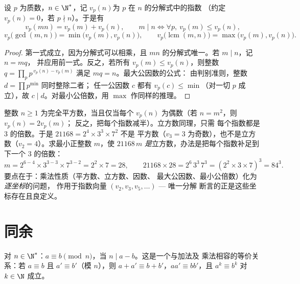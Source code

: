 \begin{proposition}[赋值]\label{prop:b1:arith:valuation}
设 $p$ 为质数，$n \in \N^*$，记 $v_p(n)$为 $p$ 在 $n$ 的分解式中的指数
（约定 $v_p(n) = 0$，若 $p \nmid n$）。于是有
\[
v_p(mn) = v_p(m) + v_p(n),
\qquad
m \mid n \iff \forall p,\ v_p(m) \leq v_p(n),
\]
\[
v_p\bigl(\gcd(m,n)\bigr) = \min\bigl(v_p(m), v_p(n)\bigr),
\qquad
v_p\bigl(\operatorname{lcm}(m,n)\bigr) = \max\bigl(v_p(m),
v_p(n)\bigr).
\]
\end{proposition}

\begin{proof}
第一式成立，因为分解式可以相乘，且
$mn$ 的分解式唯一。若 $m \mid n$，记 $n = mq$，
并应用前一式。反之，若所有 $v_p(m) \leq v_p(n)$，则整数 $q =
\prod_p p^{\,v_p(n) - v_p(m)}$ 满足 $mq = n$。最大公因数的公式：
由判别准则，整数 $d = \prod p^{\min}$ 同时整除二者；
任一公因数 $c$ 都有 $v_p(c) \leq \min$（对一切 $p$ 成立），故 $c
\mid d$。对最小公倍数，用 $\max$ 作同样的推理。
\end{proof}

\begin{example}[用赋值看平方数与立方数]\label{ex:b1:arith:squarecube}
整数 $n \geq 1$ 为完全平方数，当且仅当每个
$v_p(n)$ 为偶数（若 $n = m^2$，则 $v_p(n) = 2v_p(m)$；
反之，把每个指数减半）。立方数同理，只需
每个指数都是 $3$ 的倍数。于是 $21168 = 2^4 \times 3^3 \times 7^2$ 不是
平方数（$v_3 = 3$ 为奇数），也不是立方数（$v_2 = 4$）。求最小正整数 $m$，使
$21168\,m$ \emph{是}立方数，办法是把每个指数补足到
下一个
$3$ 的倍数：
\[
m = 2^{6-4} \times 3^{3-3} \times 7^{3-2} = 2^2 \times 7 = 28,
\qquad
21168 \times 28 = 2^6\,3^3\,7^3 = (2^2 \times 3 \times 7)^3
= 84^3 .
\]
要点在于：乘法性质（平方数、立方数、因数、
最大公因数、最小公倍数）化为\emph{逐坐标}的问题，
作用于指数向量 $(v_2, v_3, v_5, \dots)$ --- 唯一分解
断言的正是这些坐标存在且良定义。
\end{example}

\section{同余}

\begin{definition}\label{def:b1:arith:congruence}
对 $n \in \N^*$：$a \equiv b \pmod n$，当 $n \mid
a - b$。这是一个与加法及
乘法相容的等价关系：若 $a \equiv b$ 且 $a' \equiv b'$（模 $n$），则
$a + a' \equiv b + b'$，$aa' \equiv bb'$，且 $a^k \equiv b^k$
对 $k \in \N$ 成立。
\end{definition}

